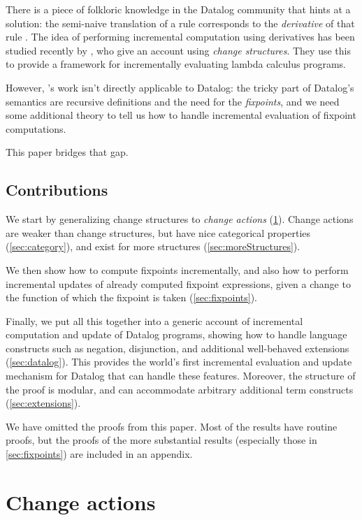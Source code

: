 There is a piece of folkloric knowledge in the Datalog community that hints at a
solution: the semi-naive translation of a rule corresponds to the
\emph{derivative} of that rule \autocites{bancilhon1986naive}[section
3.2.2]{bancilhon1986amateur}. The idea of performing incremental computation using derivatives has been
studied recently by \textcite{cai2014changes}, who give an account using
\emph{change structures}. They use this to provide a framework for incrementally evaluating lambda calculus programs.

However, \citeauthor{cai2014changes}'s work isn't directly applicable to Datalog: the tricky part
of Datalog's semantics are recursive definitions and the need for the \emph{fixpoints}, and we need some additional theory to tell us how to
handle incremental evaluation of fixpoint computations.

This paper bridges that gap.

\subsection{Contributions}

We start by generalizing change structures to
\emph{change actions} (\cref{sec:changeActions}). Change actions are weaker than change structures, but
have nice categorical properties (\cref{sec:category}), and exist for more structures (\cref{sec:moreStructures}).

We then show how to compute fixpoints incrementally, and also how to perform
incremental updates of already computed fixpoint expressions, given a change to
the function of which the fixpoint is taken (\cref{sec:fixpoints}).

Finally, we put all this together into a generic account of incremental
computation and update of Datalog programs, showing how to handle 
language constructs such as negation, disjunction, and additional well-behaved
extensions (\cref{sec:datalog}). This provides the world's first incremental
evaluation and update mechanism for Datalog that can handle these features. Moreover, the structure of the
proof is modular, and can accommodate arbitrary additional
term constructs (\cref{sec:extensions}).

We have omitted the proofs from this paper. Most of the results have routine
proofs, but the proofs of the more substantial results
(especially those in \cref{sec:fixpoints}) are included in an appendix.

\section{Change actions}
\label{sec:changeActions}

